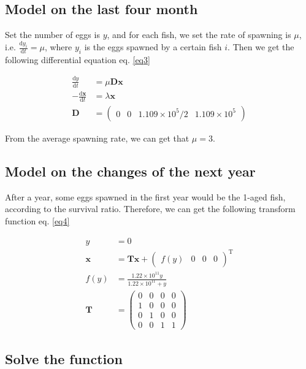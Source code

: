 \documentclass{IEEEtran}
\begin{document}
\subsection{Model on the last four month}
Set the number of eggs is $y$, and for each fish, we set the rate of spawning is $\mu$, i.e. $\frac {\mathrm d y_i}{\mathrm d t} = \mu$, where $y_i$ is the eggs spawned by a certain fish $i$. Then we get the following differential equation eq. \ref{eq3}

\begin{align}
    \label{eq3}
    \frac {\mathrm d y}{\mathrm d t} &= \mu \mathbf D \bm x\\
    -\frac{\mathrm d \bm x}{\mathrm d t} &=\lambda \bm x\\
    \mathbf D &= \begin{pmatrix} 0 & 0 & 1.109\times10^5/2&1.109\times10^5\end{pmatrix}
\end{align}

From the average spawning rate, we can get that $\mu = 3$.

\subsection{Model on the changes of the next year}

After a year, some eggs spawned in the first year would be the 1-aged fish, according to the survival ratio. Therefore, we can get the following transform function eq. \ref{eq4}

\begin{align}
    \label{eq4}
    y &= 0\\
    \bm x &= \mathbf T \bm x +\begin{pmatrix} f(y)&0&0&0\end{pmatrix}^{\mathrm T}\\
    f(y) &= \frac{1.22\times 10 ^{11}y}{1.22\times 10 ^{11} + y}\\
    \mathbf T &= \begin{pmatrix} 0 & 0 & 0 & 0 \\ 1& 0 & 0 & 0 \\ 0 & 1 & 0 & 0 \\0 & 0 & 1 & 1 \end{pmatrix}
\end{align}

\subsection{Solve the function}
\end{document}
